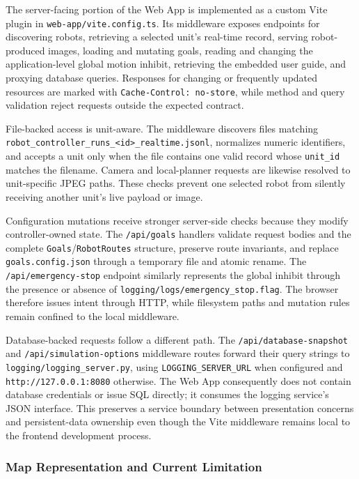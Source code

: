 The server-facing portion of the Web App is implemented as a custom Vite plugin in \texttt{web-app/vite.config.ts}. Its middleware exposes endpoints for discovering robots, retrieving a selected unit's real-time record, serving robot-produced images, loading and mutating goals, reading and changing the application-level global motion inhibit, retrieving the embedded user guide, and proxying database queries. Responses for changing or frequently updated resources are marked with \texttt{Cache-Control: no-store}, while method and query validation reject requests outside the expected contract.

File-backed access is unit-aware. The middleware discovers files matching \texttt{robot\_controller\_runs\_<id>\_realtime.jsonl}, normalizes numeric identifiers, and accepts a unit only when the file contains one valid record whose \texttt{unit\_id} matches the filename. Camera and local-planner requests are likewise resolved to unit-specific JPEG paths. These checks prevent one selected robot from silently receiving another unit's live payload or image.

Configuration mutations receive stronger server-side checks because they modify controller-owned state. The \texttt{/api/goals} handlers validate request bodies and the complete \texttt{Goals}/\texttt{RobotRoutes} structure, preserve route invariants, and replace \texttt{goals.config.json} through a temporary file and atomic rename. The \texttt{/api/emergency-stop} endpoint similarly represents the global inhibit through the presence or absence of \texttt{logging/logs/emergency\_stop.flag}. The browser therefore issues intent through HTTP, while filesystem paths and mutation rules remain confined to the local middleware.

Database-backed requests follow a different path. The \texttt{/api/database-snapshot} and \texttt{/api/simulation-options} middleware routes forward their query strings to \texttt{logging/logging\_server.py}, using \texttt{LOGGING\_SERVER\_URL} when configured and \texttt{http://127.0.0.1:8080} otherwise. The Web App consequently does not contain database credentials or issue SQL directly; it consumes the logging service's JSON interface. This preserves a service boundary between presentation concerns and persistent-data ownership even though the Vite middleware remains local to the frontend development process.

\subsubsection{Map Representation and Current Limitation}

